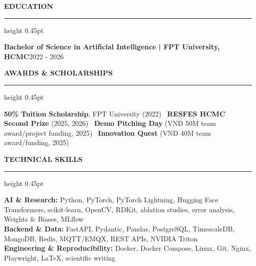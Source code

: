 \documentclass[10pt]{article}
\newcommand{\cvsection}[1]{%
    \vspace{6.2pt}%
    {\color{accent}\bfseries\small #1}\par
    \vspace{2.3pt}%
    {\color{rulegray}\hrule height 0.45pt}\vspace{4.0pt}%
}
\newcommand{\entry}[2]{%
    \textbf{#1}\hfill {\color{muted}\small #2}\par
}
\begin{document}
\cvsection{EDUCATION}
\entry{Bachelor of Science in Artificial Intelligence | FPT University, HCMC}{2022 - 2026}

\cvsection{AWARDS \& SCHOLARSHIPS}
{\small \textbf{50\% Tuition Scholarship}, FPT University (2022) \textbullet\
\textbf{RESFES HCMC Second Prize} (2025, 2026) \textbullet\
\textbf{Demo Pitching Day} (VND 50M team award/project funding, 2025) \textbullet\
\textbf{Innovation Quest} (VND 40M team award/funding, 2025)}

\cvsection{TECHNICAL SKILLS}
{\footnotesize
\textbf{AI \& Research:} Python, PyTorch, PyTorch Lightning, Hugging Face Transformers, scikit-learn, OpenCV, RDKit, ablation studies, error analysis, Weights \& Biases, MLflow\\
\textbf{Backend \& Data:} FastAPI, Pydantic, Pandas, PostgreSQL, TimescaleDB, MongoDB, Redis, MQTT/EMQX, REST APIs, NVIDIA Triton\\
\textbf{Engineering \& Reproducibility:} Docker, Docker Compose, Linux, Git, Nginx, Playwright, LaTeX, scientific writing
}
\end{document}
